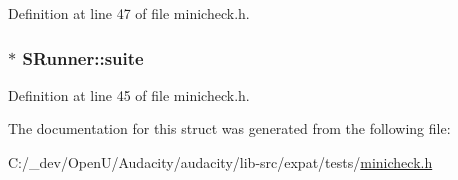 Definition at line 47 of file minicheck.\+h.

\subsubsection[{\texorpdfstring{suite}{suite}}]{$\ast$ S\+Runner\+::suite}\hypertarget{struct_s_runner_a25e6f4691d777f9b136b917f299fd6fe}{}\label{struct_s_runner_a25e6f4691d777f9b136b917f299fd6fe}


Definition at line 45 of file minicheck.\+h.



The documentation for this struct was generated from the following file\+:\begin{DoxyCompactItemize}
\item 
C\+:/\+\_\+dev/\+Open\+U/\+Audacity/audacity/lib-\/src/expat/tests/\hyperlink{minicheck_8h}{minicheck.\+h}\end{DoxyCompactItemize}
